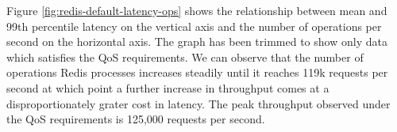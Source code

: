 Figure \ref{fig:redis-default-latency-ops} shows the relationship between mean and 99th percentile latency on the vertical axis and the number of operations per second on the horizontal axis. The graph has been trimmed to show only data which satisfies the QoS requirements. We can observe that the number of operations Redis processes increases steadily until it reaches 119k requests per second at which point a further increase in throughput comes at a disproportionately grater cost in latency. The peak throughput observed under the QoS requirements is 125,000 requests per second.